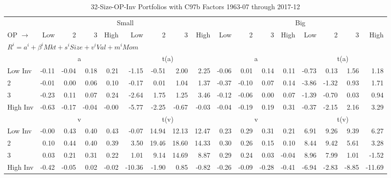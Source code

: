 
\begin{table}[!ht]
\footnotesize
\centering
\caption{32-Size-OP-Inv Portfolios with C97b Factors 1963-07 through 2017-12}
\begin{tabular}{lrrrrrrrrrrrrrrrr}
  \toprule
    & \multicolumn{8}{c}{Small} & \multicolumn{8}{c}{Big} \\
      \cmidrule(r){2-9} \cmidrule(r){10-17}
    OP $\rightarrow$ & Low & 2 & 3 & High & Low & 2 & 3 & High & Low & 2 & 3 & High & Low & 2 & 3 & High \\ 
  \midrule
  \multicolumn{17}{l}{$R^i=a^i+\beta^iMkt+s^iSize+v^iVal+m^iMom$} \\

  
    
      & \multicolumn{4}{c}{a} & \multicolumn{4}{c}{t(a)}
    
      & \multicolumn{4}{c}{a} & \multicolumn{4}{c}{t(a)}
    
    \\
      \cmidrule(r){2-5} \cmidrule(r){6-9} \cmidrule(r){10-13} \cmidrule(r){14-17}

    Low Inv   & -0.11  & -0.04  & 0.18  & 0.21  & -1.15  & -0.51  & 2.00  & 2.25  & -0.06  & 0.01  & 0.14  & 0.11  & -0.73  & 0.13  & 1.56  & 1.18  \\
           2  & -0.01  & 0.00  & 0.06  & 0.10  & -0.17  & 0.01  & 1.04  & 1.37  & -0.37  & -0.10  & 0.07  & 0.14  & -3.86  & -1.32  & 0.93  & 1.71  \\
           3  & -0.23  & 0.11  & 0.07  & 0.24  & -2.64  & 1.75  & 1.25  & 3.46  & -0.12  & -0.06  & 0.00  & 0.07  & -1.39  & -0.70  & 0.03  & 0.94  \\
    High Inv  & -0.63  & -0.17  & -0.04  & -0.00  & -5.77  & -2.25  & -0.67  & -0.03  & -0.04  & -0.19  & 0.19  & 0.31  & -0.37  & -2.15  & 2.16  & 3.29  \\

  
    
      & \multicolumn{4}{c}{v} & \multicolumn{4}{c}{t(v)}
    
      & \multicolumn{4}{c}{v} & \multicolumn{4}{c}{t(v)}
    
    \\
      \cmidrule(r){2-5} \cmidrule(r){6-9} \cmidrule(r){10-13} \cmidrule(r){14-17}

    Low Inv   & -0.00  & 0.43  & 0.40  & 0.43  & -0.07  & 14.94  & 12.13  & 12.47  & 0.23  & 0.29  & 0.31  & 0.21  & 6.91  & 9.26  & 9.39  & 6.27  \\
           2  & 0.10  & 0.44  & 0.40  & 0.39  & 3.50  & 19.46  & 18.60  & 14.33  & 0.30  & 0.26  & 0.15  & 0.10  & 8.44  & 9.42  & 5.61  & 3.28  \\
           3  & 0.03  & 0.21  & 0.31  & 0.22  & 1.01  & 9.14  & 14.69  & 8.87  & 0.29  & 0.24  & 0.03  & -0.04  & 8.96  & 7.99  & 1.01  & -1.52  \\
    High Inv  & -0.42  & -0.05  & 0.02  & -0.02  & -10.36  & -1.90  & 0.85  & -0.82  & -0.26  & -0.09  & -0.28  & -0.41  & -6.94  & -2.83  & -8.85  & -11.69  \\


\end{tabular}
\end{table}
